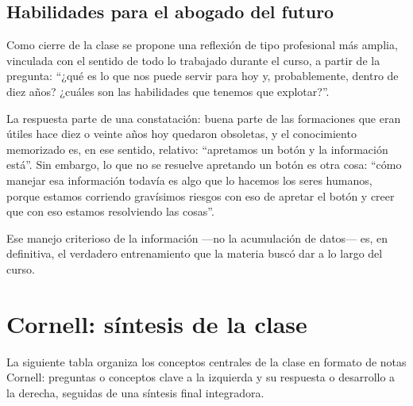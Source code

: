 \documentclass[12pt,oneside]{book}
\begin{document}
\section{Habilidades para el abogado del futuro}

Como cierre de la clase se propone una reflexión de tipo profesional más amplia, vinculada con el sentido de todo lo trabajado durante el curso, a partir de la pregunta: ``¿qué es lo que nos puede servir para hoy y, probablemente, dentro de diez años? ¿cuáles son las habilidades que tenemos que explotar?''.

La respuesta parte de una constatación: buena parte de las formaciones que eran útiles hace diez o veinte años hoy quedaron obsoletas, y el conocimiento memorizado es, en ese sentido, relativo: ``apretamos un botón y la información está''. Sin embargo, lo que no se resuelve apretando un botón es otra cosa: ``cómo manejar esa información todavía es algo que lo hacemos los seres humanos, porque estamos corriendo gravísimos riesgos con eso de apretar el botón y creer que con eso estamos resolviendo las cosas''.

Ese manejo criterioso de la información ---no la acumulación de datos--- es, en definitiva, el verdadero entrenamiento que la materia buscó dar a lo largo del curso.

\chapter{Cornell: síntesis de la clase}

La siguiente tabla organiza los conceptos centrales de la clase en formato de notas Cornell: preguntas o conceptos clave a la izquierda y su respuesta o desarrollo a la derecha, seguidas de una síntesis final integradora.
\end{document}
